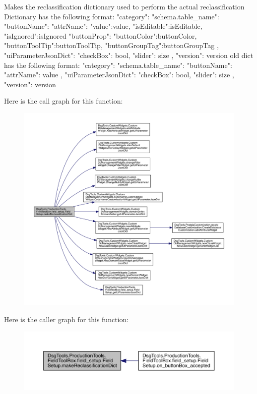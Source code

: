 \begin{DoxyVerb}Makes the reclassification dictionary used to perform the actual reclassification
Dictionary has the following format:
{
    "category": {
"schema.table_name":{
    "buttonName":{
        "attrName": {"value":value, "isEditable":isEditable, "isIgnored":isIgnored}
        "buttonProp": {"buttonColor":buttonColor, "buttonToolTip":buttonToolTip, "buttonGroupTag":buttonGroupTag}
    }
},
    "uiParameterJsonDict": {
"checkBox": bool, 
"slider": size
}, 
    "version": version
    }
}
old dict has the following format:
{
    "category": {
"schema.table_name":{
    "buttonName":{
        "attrName": value
    }
},
    "uiParameterJsonDict": {
    "checkBox": bool, 
    "slider": size
}, 
    "version": version
    }
}
\end{DoxyVerb}
 Here is the call graph for this function\+:
\nopagebreak
\begin{figure}[H]
\begin{center}
\leavevmode
\includegraphics[width=350pt]{class_dsg_tools_1_1_production_tools_1_1_field_tool_box_1_1field__setup_1_1_field_setup_a9de105e60c5ab85740496e84b77d390a_cgraph}
\end{center}
\end{figure}
Here is the caller graph for this function\+:
\nopagebreak
\begin{figure}[H]
\begin{center}
\leavevmode
\includegraphics[width=350pt]{class_dsg_tools_1_1_production_tools_1_1_field_tool_box_1_1field__setup_1_1_field_setup_a9de105e60c5ab85740496e84b77d390a_icgraph}
\end{center}
\end{figure}
